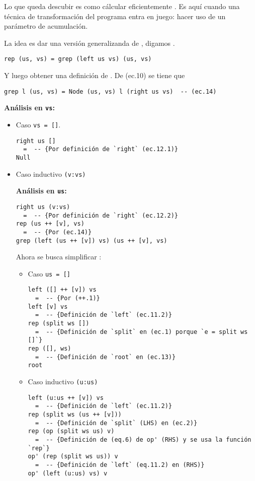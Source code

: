 Lo que queda descubir es como cálcular eficientemente .
Es aquí cuando una técnica de transformación del programa entra en juego: %
hacer uso de un parámetro de acumulación. %

La idea es dar una versión generalizanda de , digamos .

\begin{verbatim}
rep (us, vs) = grep (left us vs) (us, vs)
\end{verbatim}

Y luego obtener una definición de . De (ec.10) se tiene que

\begin{verbatim}
grep l (us, vs) = Node (us, vs) l (right us vs)  -- (ec.14)
\end{verbatim}

\textbf{Análisis en \texttt{vs}:}
\begin{itemize}
\item Caso \texttt{vs = []}.
\begin{verbatim}
right us []
  =  -- {Por definición de `right` (ec.12.1)}
Null
\end{verbatim}

\item Caso inductivo \texttt{(v:vs)}

\textbf{Análisis en \texttt{us}:}
\begin{verbatim}
right us (v:vs)
  =  -- {Por definición de `right` (ec.12.2)}
rep (us ++ [v], vs)
  =  -- {Por (ec.14)}
grep (left (us ++ [v]) vs) (us ++ [v], vs)
\end{verbatim}

Ahora se busca simplificar :
\begin{itemize}
\item Caso \texttt{us = []}
\begin{verbatim}
left ([] ++ [v]) vs
  =  -- {Por (++.1)}
left [v] vs
  =  -- {Definición de `left` (ec.11.2)}
rep (split ws []) 
  =  -- {Definición de `split` en (ec.1) porque `e = split ws []`}
rep ([], ws)
  =  -- {Definición de `root` en (ec.13)}
root
\end{verbatim}

\item Caso inductivo \texttt{(u:us)}
\begin{verbatim}
left (u:us ++ [v]) vs
  =  -- {Definición de `left` (ec.11.2)}
rep (split ws (us ++ [v]))
  =  -- {Definición de `split` (LHS) en (ec.2)}
rep (op (split ws us) v)
  =  -- {Definición de (eq.6) de op' (RHS) y se usa la función `rep`}
op' (rep (split ws us)) v
  =  -- {Definición de `left` (eq.11.2) en (RHS)}
op' (left (u:us) vs) v
\end{verbatim}

\end{itemize}
\end{itemize}

